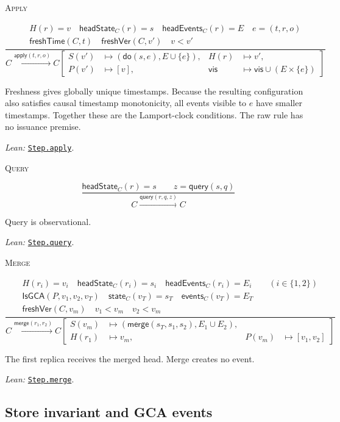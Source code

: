 \documentclass[11pt]{article}
\theoremstyle{definition}
\newcommand{\doop}{\mathsf{do}}
\newcommand{\merge}{\mathsf{merge}}
\newcommand{\query}{\mathsf{query}}
\newcommand{\vis}{\mathrel{\mathsf{vis}}}
\newcommand{\src}[2]{\href{../../#1}{\texttt{#2}}}
\newcommand{\anchor}[2]{\par\smallskip\noindent\emph{Lean: }\src{#1}{#2}.}
\newenvironment{semanticrule}[1]
  {\par\medskip\noindent
   \begin{minipage}[t]{0.13\textwidth}\raggedright\scshape #1\end{minipage}%
   \begin{minipage}[t]{0.84\textwidth}\centering\vspace{-1ex}}
  {\end{minipage}\par\medskip}
\begin{document}
\begin{semanticrule}{Apply}
\[
\frac{
 \begin{gathered}
 H(r)=v\quad \mathsf{headState}_C(r)=s\quad
 \mathsf{headEvents}_C(r)=E\quad e=(t,r,o)\\
 \mathsf{freshTime}(C,t)\quad \mathsf{freshVer}(C,v')\quad v<v'
 \end{gathered}
}{
 C\xrightarrow{\mathsf{apply}(t,r,o)}
 C\!\left[\begin{aligned}
 S(v')&\mapsto(\doop(s,e),E\cup\{e\}),&H(r)&\mapsto v',\\
 P(v')&\mapsto[v],&\vis&\mapsto\vis\cup(E\times\{e\})
 \end{aligned}\right]}
\]
\end{semanticrule}
Freshness gives globally unique timestamps. Because the resulting configuration
also satisfies causal timestamp monotonicity, all events visible to $e$ have
smaller timestamps.
Together these are the Lamport-clock conditions. The raw rule has no issuance
premise.
\anchor{Sal/MRDTs/Framework/Execution.lean}{Step.apply}

\begin{semanticrule}{Query}
\[
\frac{\mathsf{headState}_C(r)=s\qquad z=\query(s,q)}
 {C\xrightarrow{\mathsf{query}(r,q,z)}C}
\]
\end{semanticrule}
Query is observational.
\anchor{Sal/MRDTs/Framework/Execution.lean}{Step.query}

\begin{semanticrule}{Merge}
\[
\frac{
 \begin{gathered}
 H(r_i)=v_i\quad \mathsf{headState}_C(r_i)=s_i\quad
 \mathsf{headEvents}_C(r_i)=E_i\qquad(i\in\{1,2\})\\
 \mathsf{IsGCA}(P,v_1,v_2,v_T)\quad
 \mathsf{state}_C(v_T)=s_T\quad \mathsf{events}_C(v_T)=E_T\\
 \mathsf{freshVer}(C,v_m)\quad v_1<v_m\quad v_2<v_m
 \end{gathered}
}{
 C\xrightarrow{\mathsf{merge}(r_1,r_2)}
 C\!\left[\begin{aligned}
 S(v_m)&\mapsto(\merge(s_T,s_1,s_2),E_1\cup E_2),\\
 H(r_1)&\mapsto v_m,&P(v_m)&\mapsto[v_1,v_2]
 \end{aligned}\right]}
\]
\end{semanticrule}
The first replica receives the merged head. Merge creates no event.
\anchor{Sal/MRDTs/Framework/Execution.lean}{Step.merge}

\subsection{Store invariant and GCA events}
\end{document}

